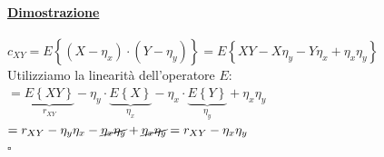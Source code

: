 \documentclass{article}
\begin{document}
\paragraph{\underline{Dimostrazione}}
$c_{XY} = E \left\{ (X-\eta_x) \cdot (Y-\eta_y) \right\} = E \left\{ XY - X\eta_y - Y\eta_x + \eta_x \eta_y\right\}$ \\
Utilizziamo la linearità dell'operatore $E$: \\
$= \underset{r_{XY}}{\underbrace{E\left\{ XY \right\}}} - \eta_y \cdot \underset{\eta_x}{\underbrace{E\left\{ X \right\}}} - \eta_x \cdot \underset{\eta_y}{\underbrace{E\left\{ Y \right\}}} + \eta_x \eta_y$ \\
$= r_{XY} - \eta_y \eta_x - \cancel{\eta_x \eta_y} + \cancel{\eta_x \eta_y} = r_{XY} - \eta_x \eta_y$ \\
\hspace*{0pt}\hfill $\square$
\end{document}
